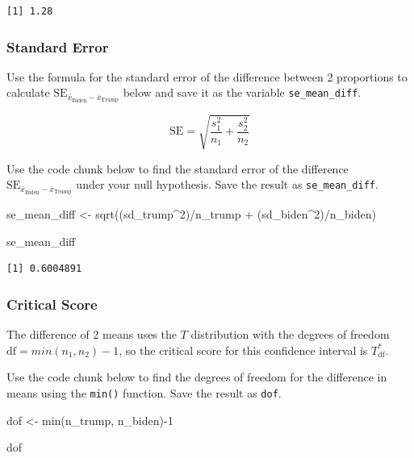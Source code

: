 \documentclass[
  letterpaper,
  DIV=11,
  numbers=noendperiod]{scrartcl}
\newenvironment{Shaded}{\begin{snugshade}}{\end{snugshade}}
\newcommand{\DecValTok}[1]{\textcolor[rgb]{0.68,0.00,0.00}{#1}}
\newcommand{\FunctionTok}[1]{\textcolor[rgb]{0.28,0.35,0.67}{#1}}
\newcommand{\NormalTok}[1]{\textcolor[rgb]{0.00,0.23,0.31}{#1}}
\newcommand{\OtherTok}[1]{\textcolor[rgb]{0.00,0.23,0.31}{#1}}
\newcommand{\SpecialCharTok}[1]{\textcolor[rgb]{0.37,0.37,0.37}{#1}}
\begin{document}
\begin{verbatim}
[1] 1.28
\end{verbatim}

\subsubsection{Standard Error}\label{standard-error-1}

Use the formula for the standard error of the difference between 2
proportions to calculate
\(\text{SE}_{\bar{x}_{\text{Biden}}-\bar{x}_{\text{Trump}}}\) below and
save it as the variable \texttt{se\_mean\_diff}.

\[
\text{SE}=\sqrt{\frac{s_1^2}{n_1}+\frac{s_2^2}{n_2}}
\]

Use the code chunk below to find the standard error of the difference
\(\text{SE}_{\bar{x}_{\text{Biden}}-\bar{x}_{\text{Trump}}}\) under your
null hypothesis. Save the result as \texttt{se\_mean\_diff}.

\begin{Shaded}
\begin{Highlighting}[]
\NormalTok{se\_mean\_diff }\OtherTok{\textless{}{-}} \FunctionTok{sqrt}\NormalTok{((sd\_trump}\SpecialCharTok{\^{}}\DecValTok{2}\NormalTok{)}\SpecialCharTok{/}\NormalTok{n\_trump }\SpecialCharTok{+}\NormalTok{ (sd\_biden}\SpecialCharTok{\^{}}\DecValTok{2}\NormalTok{)}\SpecialCharTok{/}\NormalTok{n\_biden)}

\NormalTok{se\_mean\_diff}
\end{Highlighting}
\end{Shaded}

\begin{verbatim}
[1] 0.6004891
\end{verbatim}

\subsubsection{Critical Score}\label{critical-score-1}

The difference of 2 means uses the \(T\) distribution with the degrees
of freedom \(\text{df}=min(n_1, n_2)-1\), so the critical score for this
confidence interval is \(T^*_{\text{df}}\).

Use the code chunk below to find the degrees of freedom for the
difference in means using the \texttt{min()} function. Save the result
as \texttt{dof}.

\begin{Shaded}
\begin{Highlighting}[]
\NormalTok{dof }\OtherTok{\textless{}{-}} \FunctionTok{min}\NormalTok{(n\_trump, n\_biden)}\SpecialCharTok{{-}}\DecValTok{1}

\NormalTok{dof}
\end{Highlighting}
\end{Shaded}
\end{document}
